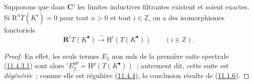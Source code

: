 \begin{proposition}[11.4.5]
\label{0.11.4.5-fr}
Supposons que dans $\boldsymbol{C}'$ les limites inductives filtrantes existent et
soient exactes. Si $\mathrm R^nT(K^i)=0$ pour tout $n>0$ et tout
$i\in\mathbb Z$, on a des isomorphismes fonctoriels
\[
  \label{0.11.4.5.1-fr}
  \mathbf R^iT(K^\bullet)\xrightarrow{\sim}
  \mathrm H^i(T(K^\bullet))\qquad(i\in\mathbb Z).
  \tag{11.4.5.1}
\]
\end{proposition}

\begin{proof}
En effet, les seuls termes $E_2$ non nuls de la première suite spectrale
(\hyperref[0.11.4.3.1-fr]{11.4.3.1}) sont alors
$'E_2^{p0}=\mathrm H^p(T(K^\bullet))$~; autrement dit, cette suite est
\emph{dégénérée}~; comme elle est régulière
(\hyperref[0.11.4.4-fr]{11.4.4}), la conclusion résulte de
(\hyperref[0.11.1.6-fr]{11.1.6}).
\end{proof}

